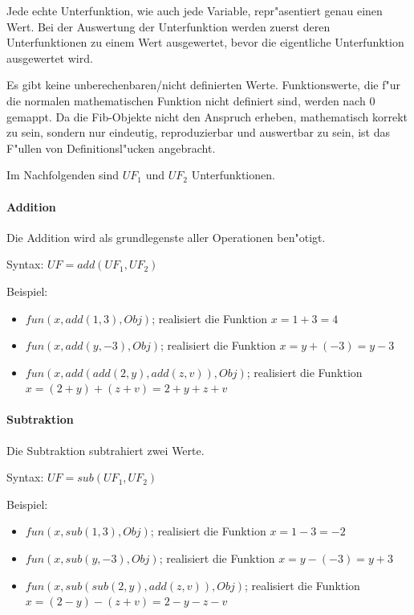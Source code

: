 Jede echte Unterfunktion, wie auch jede Variable, repr"asentiert genau einen Wert. Bei der Auswertung der Unterfunktion werden zuerst deren Unterfunktionen zu einem Wert ausgewertet, bevor die eigentliche Unterfunktion ausgewertet wird.

Es gibt keine unberechenbaren/nicht definierten Werte. Funktionswerte, die f"ur die normalen mathematischen Funktion nicht definiert sind, werden nach $0$ gemappt. Da die Fib-Objekte nicht den Anspruch erheben, mathematisch korrekt zu sein, sondern nur eindeutig, reproduzierbar und auswertbar zu sein, ist das F"ullen von Definitionsl"ucken angebracht.

\bigskip
Im Nachfolgenden sind $UF_1$ und $UF_2$ Unterfunktionen.


\paragraph{Addition}

Die Addition wird als grundlegenste aller Operationen ben"otigt.

\bigskip\noindent
Syntax:
$UF=add( UF_1, UF_2 )$

\bigskip\noindent
Beispiel:
\begin{itemize}
 \item $fun(x, add( 1, 3), Obj)$; realisiert die Funktion $x=1+3=4$
 \item $fun(x, add( y, -3), Obj)$; realisiert die Funktion $x=y+(-3)=y-3$
 \item $fun(x, add( add(2,y), add( z, v ) ), Obj)$; realisiert die Funktion $x=(2+y)+(z+v)=2+y+z+v$
\end{itemize}


\paragraph{Subtraktion}

Die Subtraktion subtrahiert zwei Werte.

\bigskip\noindent
Syntax:
$UF=sub( UF_1, UF_2 )$


\bigskip\noindent
Beispiel:
\begin{itemize}
 \item $fun(x, sub( 1, 3), Obj)$; realisiert die Funktion $x=1-3=-2$
 \item $fun(x, sub( y, -3), Obj)$; realisiert die Funktion $x=y-(-3)=y+3$
 \item $fun(x, sub( sub( 2, y ), add( z, v ) ), Obj)$; realisiert die Funktion $x=(2-y)-(z+v)=2-y-z-v$
\end{itemize}


